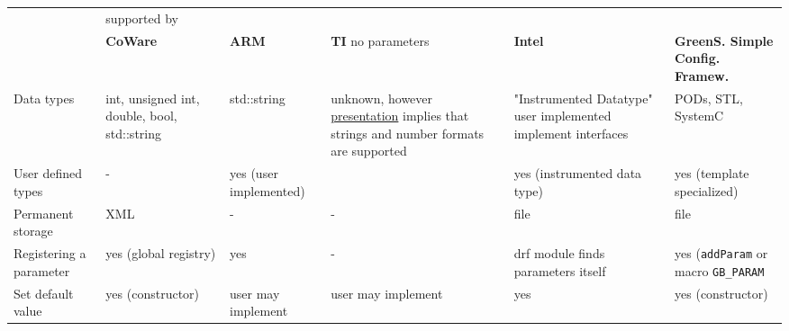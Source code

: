 \begin{landscape}
\begin{table}[H]
	\begin{tabularx}{23cm}{|X|X|X|X|X|X|}
		\cline{1-1}\cline{2-2}\cline{3-3}\cline{4-4}\cline{5-5}\cline{6-6}
		               & \multicolumn{5}{|l|}{ supported by    }\\ 
		\cline{1-1}\cline{2-2}\cline{3-3}\cline{4-4}\cline{5-5}\cline{6-6}
		               & {\bf Co\lstinline||Ware}   & {\bf ARM}   & {\bf TI} \newline no parameters   & {\bf Intel}   & {\bf GreenS. Simple \newline Config. \newline  Framew.}  \\ 
	
		\cline{1-1}\cline{2-2}\cline{3-3}\cline{4-4}\cline{5-5}\cline{6-6}
		Data types     & int, unsigned int, \newline double, bool, std::string    & std::string    & unknown, however \href{http://www.greensocs.com/SystemC/SystemCEvents/DATE2007Slides?action=AttachFile\&do=get\&target=systemPython-date-presentation-07.ppt}{presentation}  \newline implies that strings and  \newline number formats are supported   & "Instrumented Datatype" \newline user implemented \newline implement interfaces   & PODs, STL, SystemC  \\ 
		\cline{1-1}\cline{2-2}\cline{3-3}\cline{4-4}\cline{5-5}\cline{6-6}
		User defined types   & -   & yes (user implemented)   &     & yes (instrumented data type)   & yes (template specialized)  \\ 
		\cline{1-1}\cline{2-2}\cline{3-3}\cline{4-4}\cline{5-5}\cline{6-6}
		Permanent storage    & XML   & -   & -   & file   & file  \\ 
		\cline{1-1}\cline{2-2}\cline{3-3}\cline{4-4}\cline{5-5}\cline{6-6}
		Registering a parameter   & yes (global registry)   &  yes    &  -    &  drf module finds  \newline parameters itself   & yes (\lstinline|addParam| or macro \lstinline|GB_PARAM|  \\ 
		\cline{1-1}\cline{2-2}\cline{3-3}\cline{4-4}\cline{5-5}\cline{6-6}
		Set default value        & yes (constructor)   & user may implement   & user may implement   & yes   & yes (constructor)  \\ 
		\cline{1-1}\cline{2-2}\cline{3-3}\cline{4-4}\cline{5-5}\cline{6-6}

\end{tabularx}
\end{table}
\end{landscape}
